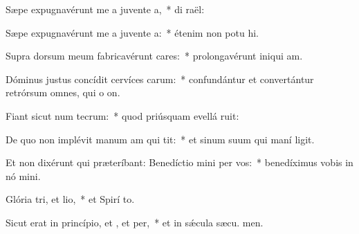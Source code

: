 \item Sæpe expugnavérunt me a juvente a,~* di  raël:
\item Sæpe expugnavérunt me a juvente a:~* étenim non potu hi.
\item Supra dorsum meum fabricavérunt cares:~* prolongavérunt iniqui am.
\item Dóminus justus concídit cervíces carum:~* confundántur et convertántur retrórsum omnes, qui o on.
\item Fiant sicut num tecrum:~* quod priúsquam evellá ruit:
\item De quo non implévit manum am qui tit:~* et sinum suum qui maní ligit.
\item Et non dixérunt qui præteríbant: Benedíctio mini per vos:~* benedíximus vobis in nó mini.
\item Glória tri, et lio,~* et Spirí to.
\item Sicut erat in princípio, et , et per,~* et in sǽcula sæcu. men.
